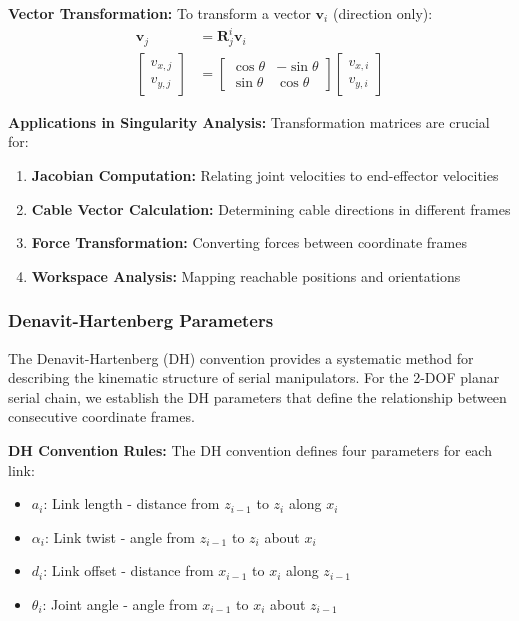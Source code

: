 \documentclass[11pt,a4paper]{article}
\begin{document}
\textbf{Vector Transformation:}
To transform a vector $\bm{v}_i$ (direction only):
\begin{align}
\bm{v}_j &= \bm{R}_j^i \bm{v}_i \\
\begin{bmatrix} v_{x,j} \\ v_{y,j} \end{bmatrix} &= \begin{bmatrix}
\cos\theta & -\sin\theta \\
\sin\theta & \cos\theta
\end{bmatrix} \begin{bmatrix} v_{x,i} \\ v_{y,i} \end{bmatrix}
\end{align}

\textbf{Applications in Singularity Analysis:}
Transformation matrices are crucial for:
\begin{enumerate}
    \item \textbf{Jacobian Computation:} Relating joint velocities to end-effector velocities
    \item \textbf{Cable Vector Calculation:} Determining cable directions in different frames
    \item \textbf{Force Transformation:} Converting forces between coordinate frames
    \item \textbf{Workspace Analysis:} Mapping reachable positions and orientations
\end{enumerate}

\subsubsection{Denavit-Hartenberg Parameters}
The Denavit-Hartenberg (DH) convention provides a systematic method for describing the kinematic structure of serial manipulators. For the 2-DOF planar serial chain, we establish the DH parameters that define the relationship between consecutive coordinate frames.

\textbf{DH Convention Rules:}
The DH convention defines four parameters for each link:
\begin{itemize}
    \item $a_i$: Link length - distance from $z_{i-1}$ to $z_i$ along $x_i$
    \item $\alpha_i$: Link twist - angle from $z_{i-1}$ to $z_i$ about $x_i$
    \item $d_i$: Link offset - distance from $x_{i-1}$ to $x_i$ along $z_{i-1}$
    \item $\theta_i$: Joint angle - angle from $x_{i-1}$ to $x_i$ about $z_{i-1}$
\end{itemize}
\end{document}
